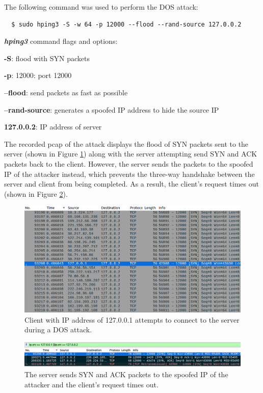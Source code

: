 \documentclass[11pt]{article}
\begin{document}
\noindent The following command was used to perform the DOS attack:
\begin{verbatim}
  $ sudo hping3 -S -w 64 -p 12000 --flood --rand-source 127.0.0.2
\end{verbatim}
\textbf{\emph{hping3}} command flags and options:

\textbf{-S}: flood with SYN packets

\textbf{-p}: 12000: port 12000

\textbf{--flood}: send packets as fast as possible

\textbf{--rand-source}: generates a spoofed IP address to hide the source IP

\textbf{127.0.0.2}: IP address of server
\newline

The recorded pcap of the attack displays the flood of SYN packets sent to the server (shown in Figure \ref{fig:client-attempt-flood})
along with the server attempting send SYN and ACK packets back to the client.
However, the server sends the packets to the spoofed IP of the attacker instead,
which prevents the three-way handshake between the server and client from being completed.
As a result, the client's request times out (shown in Figure \ref{fig:filtered-dos}).

\begin{figure}[h]
\centering
\includegraphics[width=.9\linewidth]{./client-attempt-flood.png}
\caption{\label{fig:client-attempt-flood}
Client with IP address of 127.0.0.1 attempts to connect to the server during a DOS attack.}
\end{figure}

\begin{figure}[h]
\centering
\includegraphics[width=.9\linewidth]{./filtered-dos.png}
\caption{\label{fig:filtered-dos}
The server sends SYN and ACK packets to the spoofed IP of the attacker and the client's request times out.}
\end{figure}
\end{document}
